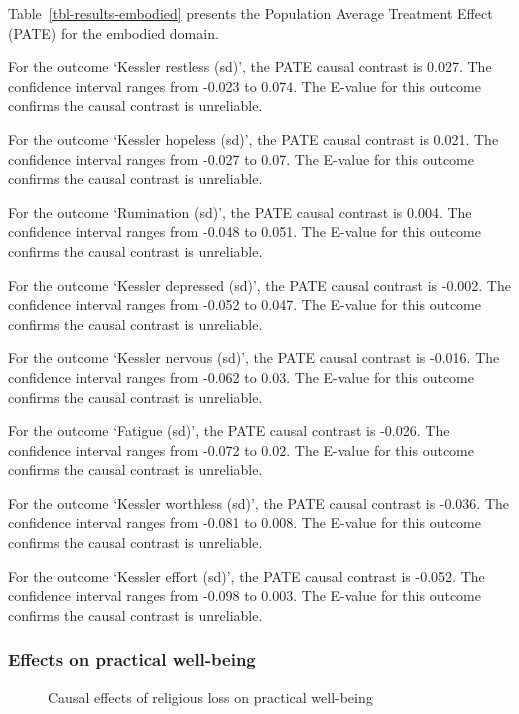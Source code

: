 \documentclass[
  singlecolumn,
  9pt]{article}
\begin{document}
Table~\ref{tbl-results-embodied} presents the Population Average
Treatment Effect (PATE) for the embodied domain.

For the outcome `Kessler restless (sd)', the PATE causal contrast is
0.027. The confidence interval ranges from -0.023 to 0.074. The E-value
for this outcome confirms the causal contrast is unreliable.

For the outcome `Kessler hopeless (sd)', the PATE causal contrast is
0.021. The confidence interval ranges from -0.027 to 0.07. The E-value
for this outcome confirms the causal contrast is unreliable.

For the outcome `Rumination (sd)', the PATE causal contrast is 0.004.
The confidence interval ranges from -0.048 to 0.051. The E-value for
this outcome confirms the causal contrast is unreliable.

For the outcome `Kessler depressed (sd)', the PATE causal contrast is
-0.002. The confidence interval ranges from -0.052 to 0.047. The E-value
for this outcome confirms the causal contrast is unreliable.

For the outcome `Kessler nervous (sd)', the PATE causal contrast is
-0.016. The confidence interval ranges from -0.062 to 0.03. The E-value
for this outcome confirms the causal contrast is unreliable.

For the outcome `Fatigue (sd)', the PATE causal contrast is -0.026. The
confidence interval ranges from -0.072 to 0.02. The E-value for this
outcome confirms the causal contrast is unreliable.

For the outcome `Kessler worthless (sd)', the PATE causal contrast is
-0.036. The confidence interval ranges from -0.081 to 0.008. The E-value
for this outcome confirms the causal contrast is unreliable.

For the outcome `Kessler effort (sd)', the PATE causal contrast is
-0.052. The confidence interval ranges from -0.098 to 0.003. The E-value
for this outcome confirms the causal contrast is unreliable.

\subsubsection{Effects on practical
well-being}\label{effects-on-practical-well-being}

\begin{figure}


\caption{\label{fig-results-practical-well-being}Causal effects of
religious loss on practical well-being}

\end{figure}%
\end{document}
